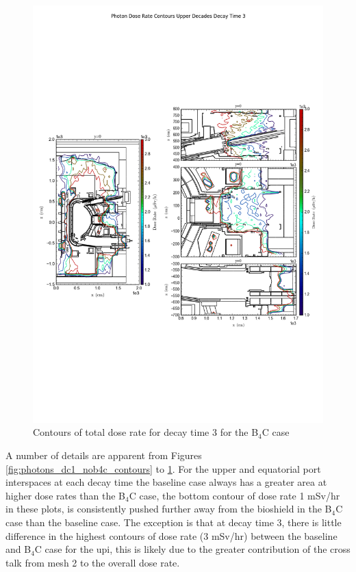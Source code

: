 \documentclass[12pt]{article}
\begin{document}
\begin{figure}[ht!]
\centering
\includegraphics[trim={0cm 8cm, 0cm 8cm},clip,scale=0.6]{../plots/final_model_with_b4c/Photon_Dose_Rate_Contours_Upper_Decades_Decay_Time_3.png}
\caption{Contours of total dose rate for decay time 3 for the B$_4$C case}
\label{fig:photons_dc3_b4c_contours}
\end{figure}
\newpage
\clearpage
A number of details are apparent from Figures \ref{fig:photons_dc1_nob4c_contours} to \ref{fig:photons_dc3_b4c_contours}.
For the upper and equatorial port interspaces at each decay time the baseline case always has a greater area at higher 
dose rates than the B$_4$C case, the bottom contour of dose rate 1 mSv/hr in these plots, is consistently pushed further
away from the bioshield in the B$_4$C case than the baseline case. The exception is that at decay time 3, there is little
difference in the highest contours of dose rate (3 mSv/hr) between the baseline and B$_4$C case for the \gls{upi}, this is 
likely due to the greater contribution of the cross talk from mesh 2 to the overall dose rate.
\end{document}

